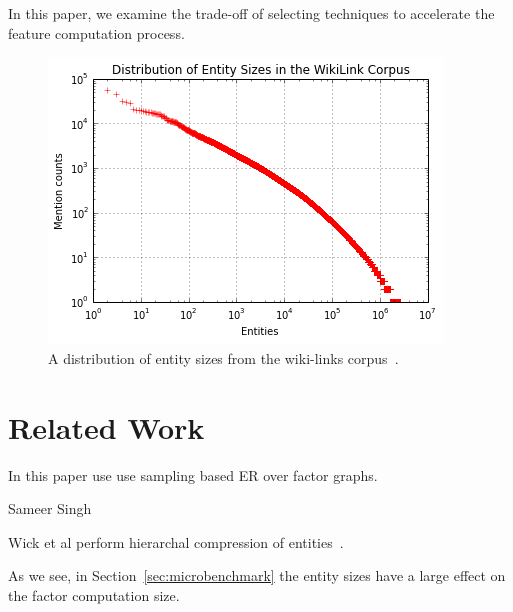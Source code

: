 In this paper, we examine the trade-off of selecting techniques to
accelerate the feature computation process.


\begin{figure}
\centering
\includegraphics[width=\columnwidth]{media/entity-distribution.png}
\caption{A distribution of entity sizes from the wiki-links corpus~\cite{singh12:wiki-links}.}
\label{fig:entity-distribution}
\end{figure}





\section{Related Work}

In this paper use use sampling based ER over factor graphs.

Sameer Singh~\cite{singh2011large}

Wick et al perform hierarchal compression of entities~\cite{Wick:2012:DHM:2390524.2390578}.


As we see, in Section~\ref{sec:microbenchmark} the entity sizes have a
large effect on the factor computation size.


